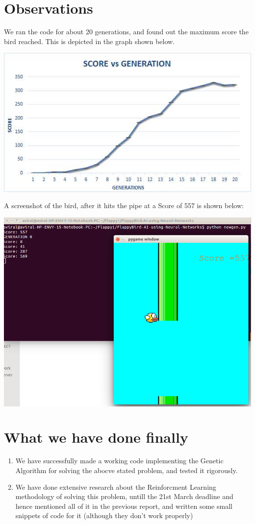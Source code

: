 \documentclass{article}
\begin{document}
\section{Observations}
We ran the code for about 20 generations, and found out the maximum score the bird reached.
This is depicted in the graph shown below.
\begin{center}
\includegraphics[width=0.5\vsize, angle = 0]{graph.png} \\
\end{center}
A screenshot of the bird, after it hits the pipe at a Score of 557 is shown below:
\begin{center}
\includegraphics[width=0.65\vsize, angle = 0]{full.png} \\
\end{center}

\section{What we have done finally}
\begin{enumerate}
\item We have successfully made a working code implementing the Genetic Algorithm for solving the abocve stated problem, and tested it rigorously.
\item We have done extensive research about the Reinforcment Learning methodology of solving this problem, untill the 21st March deadline and hence mentioned all of it in the previous report, and written some small snippets of code for it (although they don't work properly)
\end{enumerate}
\end{document}
